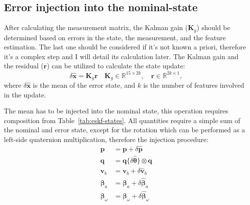 \subsection{Error injection into the nominal-state}

After calculating the measurement matrix, the Kalman gain ($\mathbf{K}_g$) should be determined based on errors in the state, the measurement, and the feature estimation. The last one should be considered if it's not known a priori, therefore it's a complex step and I will detail its calculation later. The Kalman gain and the residual ($\mathbf{r}$) can be utilized to calculate the state update:
\begin{equation}
    \delta\hat{\mathbf{x}} = \mathbf{K}_g\mathbf{r} \quad \mathbf{K}_g\in\mathbb{R}^{15\times 2k},\quad\mathbf{r}\in\mathbb{R}^{2k\times 1},
\end{equation}
where $\delta\hat{\mathbf{x}}$ is the mean of the error state, and $k$ is the number of features involved in the update.

The mean has to be injected into the nominal state, this operation requires composition from Table~\ref{tab:eskf-states}. All quantities require a simple sum of the nominal and error state, except for the rotation which can be performed as a left-side quaternion multiplication, therefore the injection procedure:
\begin{subequations}
\begin{align}
    \mathbf{p} &= \mathbf{p} + \delta\hat{\mathbf{p}} \\
    \mathbf{q} &= \mathbf{q}\{\delta\hat{\boldsymbol{\theta}}\}\otimes\mathbf{q} \\
    \mathbf{v}_b &= \mathbf{v}_b + \delta\hat{\mathbf{v}}_b \\
    \boldsymbol{\beta}_a &= \boldsymbol{\beta}_a + \delta\hat{\boldsymbol{\beta}}_a \\
    \boldsymbol{\beta}_\omega &= \boldsymbol{\beta}_\omega + \delta\hat{\boldsymbol{\beta}}_\omega
\end{align}
\end{subequations}

